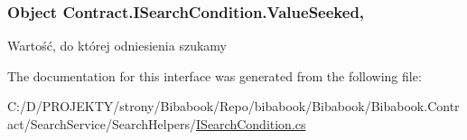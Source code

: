 \hypertarget{interface_contract_1_1_i_search_condition_a24149b101ea72f8b02bf839a50ead65e}{}
\subsubsection[{Value\+Seeked}]{\setlength{\rightskip}{0pt plus 5cm}Object Contract.\+I\+Search\+Condition.\+Value\+Seeked\hspace{0.3cm}{\ttfamily [get]}, {\ttfamily [set]}}\label{interface_contract_1_1_i_search_condition_a24149b101ea72f8b02bf839a50ead65e}


Wartość, do której odniesienia szukamy 



The documentation for this interface was generated from the following file\+:\begin{DoxyCompactItemize}
\item 
C\+:/\+D/\+P\+R\+O\+J\+E\+K\+T\+Y/strony/\+Bibabook/\+Repo/bibabook/\+Bibabook/\+Bibabook.\+Contract/\+Search\+Service/\+Search\+Helpers/\hyperlink{_i_search_condition_8cs}{I\+Search\+Condition.\+cs}\end{DoxyCompactItemize}
